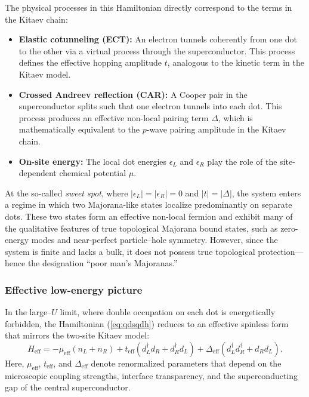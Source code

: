\documentclass[11pt, letterpaper, titlepage]{article}
\begin{document}
The physical processes in this Hamiltonian directly correspond to the terms in the Kitaev chain:
\begin{itemize}
    \item \textbf{Elastic cotunneling (ECT):} An electron tunnels coherently from one dot to the other via a virtual process through the superconductor. This process defines the effective hopping amplitude $t$, analogous to the kinetic term in the Kitaev model.
    \item \textbf{Crossed Andreev reflection (CAR):} A Cooper pair in the superconductor splits such that one electron tunnels into each dot. This process produces an effective non-local pairing term $\Delta$, which is mathematically equivalent to the $p$-wave pairing amplitude in the Kitaev chain.
    \item \textbf{On-site energy:} The local dot energies $\epsilon_L$ and $\epsilon_R$ play the role of the site-dependent chemical potential $\mu$.
\end{itemize}

At the so-called \textit{sweet spot}, where $|\epsilon_L| = |\epsilon_R| = 0$ and $|t| = |\Delta|$, the system enters a regime in which two Majorana-like states localize predominantly on separate dots. These two states form an effective non-local fermion and exhibit many of the qualitative features of true topological Majorana bound states, such as zero-energy modes and near-perfect particle–hole symmetry. However, since the system is finite and lacks a bulk, it does not possess true topological protection—hence the designation “poor man’s Majoranas.”

\subsubsection{Effective low-energy picture}

In the large–$U$ limit, where double occupation on each dot is energetically forbidden, the Hamiltonian (\ref{eq:qdsqdh}) reduces to an effective spinless form that mirrors the two-site Kitaev model:
\begin{equation}
H_{\mathrm{eff}} =
- \mu_{\mathrm{eff}} (n_L + n_R)
+ t_{\mathrm{eff}} (d_L^\dagger d_R + d_R^\dagger d_L)
+ \Delta_{\mathrm{eff}} (d_L^\dagger d_R^\dagger + d_R d_L).
\end{equation}
Here, $\mu_{\mathrm{eff}}$, $t_{\mathrm{eff}}$, and $\Delta_{\mathrm{eff}}$ denote renormalized parameters that depend on the microscopic coupling strengths, interface transparency, and the superconducting gap of the central superconductor.
\end{document}
